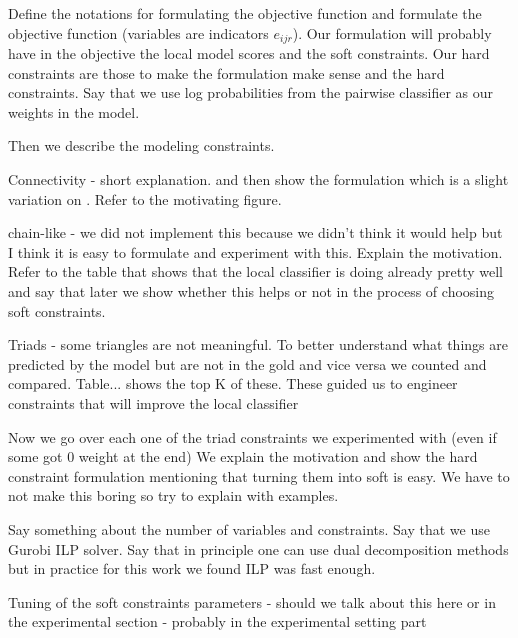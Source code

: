 Define the notations for formulating the objective function and formulate the objective function (variables are indicators $e_{ijr}$). Our formulation will probably have in the objective the local model scores and the soft constraints. Our hard constraints are those to make the formulation make sense and the hard constraints. Say that we use log probabilities from the pairwise classifier as our weights in the model.

Then we describe the modeling constraints. 

Connectivity - short explanation. and then show the formulation which is a slight variation on \cite{Martins09}. Refer to the motivating figure. 

chain-like - we did not implement this because we didn't think it would help but I think it is easy to formulate and experiment with this. Explain the motivation. Refer to the table that shows that the local classifier is doing already pretty well and say that later we show whether this helps or not in the process of choosing soft constraints.

Triads - some triangles are not meaningful. To better understand what things are predicted by the model but are not in the gold and vice versa we counted and compared. Table... shows the top K of these. These guided us to engineer constraints that will improve the local classifier 

Now we go over each one of the triad constraints we experimented with (even if some got 0 weight at the end) We explain the motivation and show the hard constraint formulation mentioning that turning them into soft is easy. We have to not make this boring so try to explain with examples.

Say something about the number of variables and constraints. Say that we use Gurobi ILP solver. Say that in principle one can use dual decomposition methods but in practice for this work we found ILP was fast enough.

Tuning of the soft constraints parameters - should we talk about this here or in the experimental section - probably in the experimental setting part



